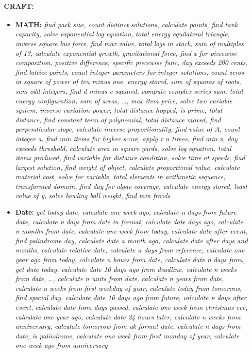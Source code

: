 \paragraph{CRAFT:}
\begin{itemize}[noitemsep, topsep=0pt]
    \item  \textbf{MATH:}  \textit{find pack size, count distinct solutions, calculate points, find tank capacity, solve exponential log equation, total energy equilateral triangle, inverse square law force, find max value, total logs in stack, sum of multiples of 13, calculate exponential growth, gravitational force, find x for piecewise composition, positive difference, specific piecewise func, day exceeds 200 cents, find lattice points, count integer parameters for integer solutions, count zeros in square of power of ten minus one, energy stored, sum of squares of roots, sum odd integers, find d minus e squared, compute complex series sum, total energy configuration, sum of areas, \dots, max item price, solve two variable system, inverse variation power, total distance hopped, is prime, total distance, find constant term of polynomial, total distance moved, find perpendicular slope, calculate inverse proportionality, find value of A, count integer a, find min items for higher score, apply r n times, find min x, day exceeds threshold, calculate area in square yards, solve log equation, total items produced, find variable for distance condition, solve time at speeds, find largest solution, find weight of object, calculate proportional value, calculate material cost, solve for variable, total elements in arithmetic sequence, transformed domain, find day for algae coverage, calculate energy stored, least value of y, solve bowling ball weight, find min froods}

    \item \textbf{Date:} \textit{get today date, calculate one week ago, calculate n days from future date, calculate n days from date in format, calculate date days ago, calculate n months from date, calculate one week from today, calculate date after event, find palindrome day, calculate date a month ago, calculate date after days and months, calculate relative date, calculate n days from reference, calculate one year ago from today, calculate n hours from date, calculate date n days from, get date today, calculate date 10 days ago from deadline, calculate n weeks from date, \dots, calculate n units from date, calculate n years from date, calculate n weeks from first weekday of year, calculate today from tomorrow, find special day, calculate date 10 days ago from future, calculate n days after event, calculate date from days passed, calculate one week from christmas eve, calculate one year ago, calculate date 24 hours later, calculate n weeks from anniversary, calculate tomorrow from uk format date, calculate n days from date, is palindrome, calculate one week from first monday of year, calculate one week ago from anniversary}


\end{itemize}
